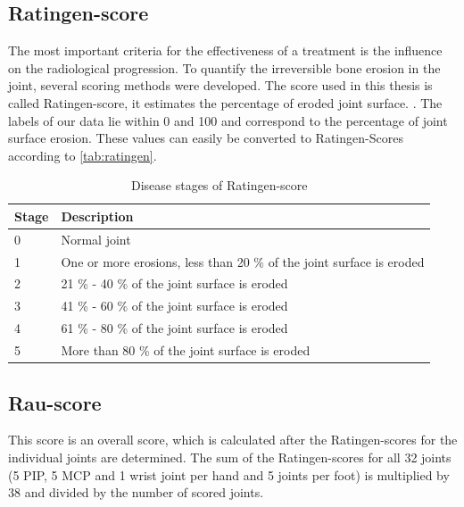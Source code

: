 \documentclass[12pt]{article}
\begin{document}
\subsection{Ratingen-score}
\label{subsec:ratingen}

The most important criteria for the effectiveness of a treatment is the influence on the radiological progression. To quantify the irreversible bone erosion in the joint, several scoring methods were developed. The score used in this thesis is called Ratingen-score, it estimates the percentage of eroded joint surface. \cite{rau_2007}. The labels of our data lie within 0 and 100 and correspond to the percentage of joint surface erosion. These values can easily be converted to Ratingen-Scores according to \autoref{tab:ratingen}.


\begin{table}[ht]
\centering
\caption{Disease stages of Ratingen-score \cite{rau_2007} }
\label{tab:ratingen}
\begin{tabular}{@{}ll@{}}
\toprule
Stage & Description                                                          \\ \midrule
0     & Normal joint                                                         \\
1     & One or more erosions, less than 20 \% of the joint surface is eroded \\
2     & 21 \% - 40 \% of the joint surface is eroded                         \\
3     & 41 \% - 60 \% of the joint surface is eroded                         \\
4     & 61 \% - 80 \% of the joint surface is eroded                         \\
5     & More than 80 \% of the joint surface is eroded                       \\ \bottomrule
\end{tabular}
\end{table}

\subsection{Rau-score}
\label{subsec:rau}

This score is an overall score, which is calculated after the Ratingen-scores for the individual joints are determined. The sum of the Ratingen-scores for all 32 joints (5 PIP, 5 MCP and 1 wrist joint per hand and 5 joints per foot) is multiplied by 38 and divided by the number of scored joints.
\end{document}
